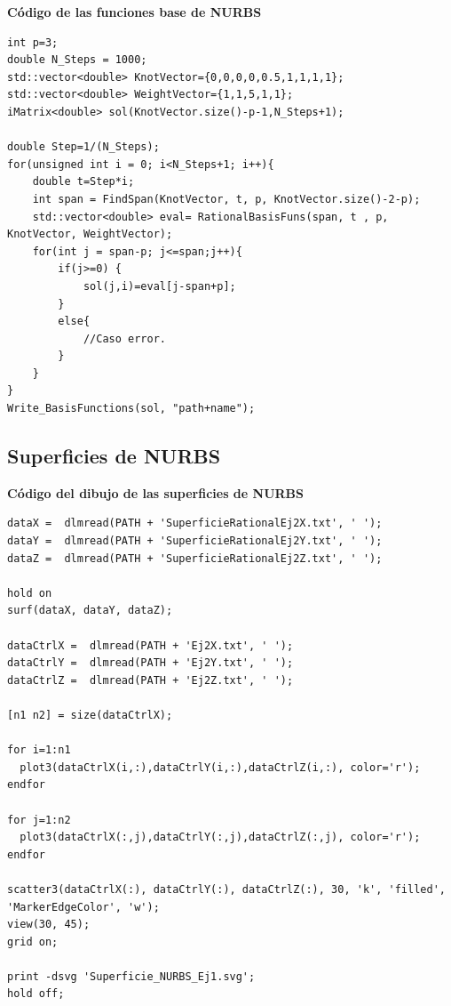 \documentclass[11pt]{book}
\theoremstyle{plain} %
\theoremstyle{definition} %
\theoremstyle{definition} %
\begin{document}
\textbf{Código de las funciones base de NURBS}
\begin{verbatim}
int p=3;
double N_Steps = 1000;
std::vector<double> KnotVector={0,0,0,0,0.5,1,1,1,1};
std::vector<double> WeightVector={1,1,5,1,1};
iMatrix<double> sol(KnotVector.size()-p-1,N_Steps+1);

double Step=1/(N_Steps);
for(unsigned int i = 0; i<N_Steps+1; i++){
    double t=Step*i;
    int span = FindSpan(KnotVector, t, p, KnotVector.size()-2-p);
    std::vector<double> eval= RationalBasisFuns(span, t , p, KnotVector, WeightVector);
    for(int j = span-p; j<=span;j++){
        if(j>=0) {
            sol(j,i)=eval[j-span+p];                
        }
        else{
            //Caso error.
        }        
    } 
}
Write_BasisFunctions(sol, "path+name");
\end{verbatim}

\subsection{Superficies de NURBS}
\label{sec:codigo_NURBS2}
\textbf{Código del dibujo de las superficies de NURBS}
\begin{verbatim}
dataX =  dlmread(PATH + 'SuperficieRationalEj2X.txt', ' ');
dataY =  dlmread(PATH + 'SuperficieRationalEj2Y.txt', ' ');
dataZ =  dlmread(PATH + 'SuperficieRationalEj2Z.txt', ' ');

hold on
surf(dataX, dataY, dataZ);

dataCtrlX =  dlmread(PATH + 'Ej2X.txt', ' ');
dataCtrlY =  dlmread(PATH + 'Ej2Y.txt', ' ');
dataCtrlZ =  dlmread(PATH + 'Ej2Z.txt', ' ');

[n1 n2] = size(dataCtrlX);

for i=1:n1
  plot3(dataCtrlX(i,:),dataCtrlY(i,:),dataCtrlZ(i,:), color='r');
endfor

for j=1:n2
  plot3(dataCtrlX(:,j),dataCtrlY(:,j),dataCtrlZ(:,j), color='r');
endfor

scatter3(dataCtrlX(:), dataCtrlY(:), dataCtrlZ(:), 30, 'k', 'filled', 'MarkerEdgeColor', 'w');
view(30, 45);
grid on;

print -dsvg 'Superficie_NURBS_Ej1.svg';
hold off;
\end{verbatim}
\end{document}
